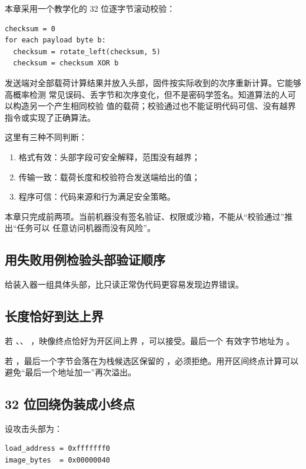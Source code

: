 本章采用一个教学化的 32 位逐字节滚动校验：

\begin{lstlisting}
checksum = 0
for each payload byte b:
  checksum = rotate_left(checksum, 5)
  checksum = checksum XOR b
\end{lstlisting}

发送端对全部载荷计算结果并放入头部，固件按实际收到的次序重新计算。它能够高概率检测
常见误码、丢字节和次序变化，但不是密码学签名。知道算法的人可以构造另一个产生相同校验
值的载荷；校验通过也不能证明代码可信、没有越界指令或实现了正确算法。

这里有三种不同判断：

\begin{enumerate}
\item 格式有效：头部字段可安全解释，范围没有越界；
\item 传输一致：载荷长度和校验符合发送端给出的值；
\item 程序可信：代码来源和行为满足安全策略。
\end{enumerate}

本章只完成前两项。当前机器没有签名验证、权限或沙箱，不能从“校验通过”推出“任务可以
任意访问机器而没有风险”。

\subsection{用失败用例检验头部验证顺序}

给装入器一组具体头部，比只读正常伪代码更容易发现边界错误。

\subsection{长度恰好到达上界}

若 、、
，映像终点恰好为开区间上界 ，可以接受。最后一个
有效字节地址为 。

若 ，最后一个字节会落在为栈候选区保留的
，必须拒绝。用开区间终点计算可以避免“最后一个地址加一”再次溢出。

\subsection{32 位回绕伪装成小终点}

设攻击头部为：

\begin{lstlisting}
load_address = 0xfffffff0
image_bytes  = 0x00000040
\end{lstlisting}

